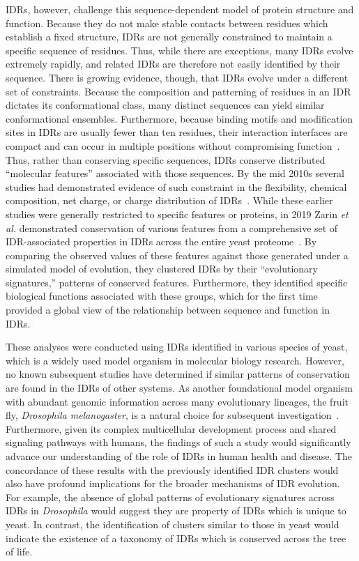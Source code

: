 IDRs, however, challenge this sequence-dependent model of protein structure and function. Because they do not make stable contacts between residues which establish a fixed structure, IDRs are not generally constrained to maintain a specific sequence of residues. Thus, while there are exceptions, many IDRs evolve extremely rapidly, and related IDRs are therefore not easily identified by their sequence. There is growing evidence, though, that IDRs evolve under a different set of constraints. Because the composition and patterning of residues in an IDR dictates its conformational class, many distinct sequences can yield similar conformational ensembles. Furthermore, because binding motifs and modification sites in IDRs are usually fewer than ten residues, their interaction interfaces are compact and can occur in multiple positions without compromising function~\cite{Tompa2014}. Thus, rather than conserving specific sequences, IDRs conserve distributed ``molecular features'' associated with those sequences. By the mid 2010s several studies had demonstrated evidence of such constraint in the flexibility, chemical composition, net charge, or charge distribution of IDRs~\cite{Daughdrill2007, Moesa2012, Zarin2017, Beh2012}. While these earlier studies were generally restricted to specific features or proteins, in 2019 Zarin \textit{et al.} demonstrated conservation of various features from a comprehensive set of IDR-associated properties in IDRs across the entire yeast proteome~\cite{Zarin2019}. By comparing the observed values of these features against those generated under a simulated model of evolution, they clustered IDRs by their ``evolutionary signatures,''  patterns of conserved features. Furthermore, they identified specific biological functions associated with these groups, which for the first time provided a global view of the relationship between sequence and function in IDRs.

These analyses were conducted using IDRs identified in various species of yeast, which is a widely used model organism in molecular biology research. However, no known subsequent studies have determined if similar patterns of conservation are found in the IDRs of other systems. As another foundational model organism with abundant genomic information across many evolutionary lineages, the fruit fly, \textit{Drosophila melanogaster}, is a natural choice for subsequent investigation~\cite{Yang2018, Miller2018, Kim2021}. Furthermore, given its complex multicellular development process and shared signaling pathways with humans, the findings of such a study would significantly advance our understanding of the role of IDRs in human health and disease. The concordance of these results with the previously identified IDR clusters would also have profound implications for the broader mechanisms of IDR evolution. For example, the absence of global patterns of evolutionary signatures across IDRs in \textit{Drosophila} would suggest they are property of IDRs which is unique to yeast. In contrast, the identification of clusters similar to those in yeast would indicate the existence of a taxonomy of IDRs which is conserved across the tree of life.

